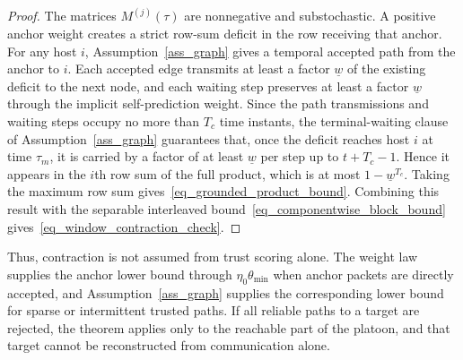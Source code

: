 \documentclass[letterpaper,journal]{IEEEtran}
\begin{document}
\begin{proof}
The matrices $M^{(j)}(\tau)$ are nonnegative and substochastic. A positive anchor weight creates a strict row-sum deficit in the row receiving that anchor. For any host $i$, Assumption~\ref{ass_graph} gives a temporal accepted path from the anchor to $i$. Each accepted edge transmits at least a factor $\underline w$ of the existing deficit to the next node, and each waiting step preserves at least a factor $\underline w$ through the implicit self-prediction weight. Since the path transmissions and waiting steps occupy no more than $T_c$ time instants, the terminal-waiting clause of Assumption~\ref{ass_graph} guarantees that, once the deficit reaches host $i$ at time $\tau_m$, it is carried by a factor of at least $\underline w$ per step up to $t+T_c-1$. Hence it appears in the $i$th row sum of the full product, which is at most $1-\underline w^{T_c}$. Taking the maximum row sum gives~\eqref{eq_grounded_product_bound}. Combining this result with the separable interleaved bound~\eqref{eq_componentwise_block_bound} gives~\eqref{eq_window_contraction_check}.
\end{proof}

Thus, contraction is not assumed from trust scoring alone. The weight law supplies the anchor lower bound through $\eta_0\theta_{\min}$ when anchor packets are directly accepted, and Assumption~\ref{ass_graph} supplies the corresponding lower bound for sparse or intermittent trusted paths. If all reliable paths to a target are rejected, the theorem applies only to the reachable part of the platoon, and that target cannot be reconstructed from communication alone.
\end{document}

